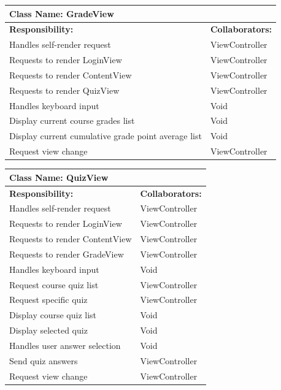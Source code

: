 \documentclass[]{article}
\begin{document}
  \begin{table}[H]
    \centering
    \begin{tabular}{|p{9cm}|p{3cm}|}
    \hline
     \multicolumn{2}{|l|}{\textbf{Class Name: GradeView}} \\
    \hline
    \textbf{Responsibility:} & \textbf{Collaborators:} \\
    \hline
    Handles self-render request & ViewController \\
    \hline
    Requests to render LoginView & ViewController \\
    \hline
    Requests to render ContentView & ViewController \\
    \hline
    Requests to render QuizView & ViewController \\
    \hline
    Handles keyboard input & Void \\
    \hline
    Display current course grades list & Void\\
    \hline
    Display current cumulative grade point average list & Void\\
    \hline
    Request view change & ViewController \\
    \hline
    \end{tabular}
  \end{table}

  \begin{table}[H]
    \centering
    \begin{tabular}{|p{9cm}|p{3cm}|}
    \hline
     \multicolumn{2}{|l|}{\textbf{Class Name: QuizView}} \\
    \hline
    \textbf{Responsibility:} & \textbf{Collaborators:} \\
    \hline
    Handles self-render request & ViewController \\
    \hline
    Requests to render LoginView & ViewController \\
    \hline
    Requests to render ContentView & ViewController \\
    \hline
    Requests to render GradeView & ViewController \\
    \hline
    Handles keyboard input & Void\\
    \hline
    Request course quiz list & ViewController \\
    \hline
    Request specific quiz & ViewController \\
    \hline
    Display course quiz list & Void\\
    \hline
    Display selected quiz & Void\\
    \hline
    Handles user answer selection & Void\\
    \hline
    Send quiz answers & ViewController \\
    \hline
    Request view change & ViewController \\
    \hline
    \end{tabular}
  \end{table}
\end{document}
